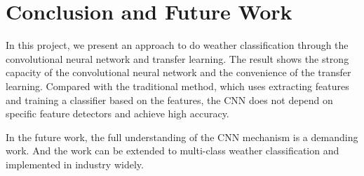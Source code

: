 \section{Conclusion and Future Work}

In this project, we present an approach to do weather classification through the convolutional neural network and transfer learning. The result shows the strong capacity of the convolutional neural network and the convenience of the transfer learning. Compared with the traditional method, which uses extracting features and training a classifier based on the features, the CNN does not depend on specific feature detectors and achieve high accuracy. 

In the future work, the full understanding of the CNN mechanism is a demanding work. And the work can be extended to multi-class weather classification and implemented in industry widely.